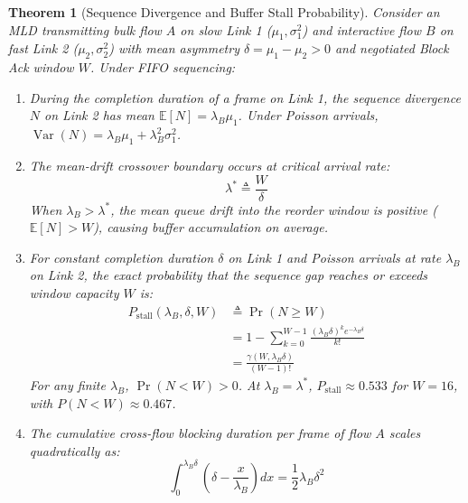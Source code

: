 \documentclass[10pt,journal,compsoc]{IEEEtran}
\newtheorem{theorem}{Theorem}
\begin{document}
\begin{theorem}[Sequence Divergence and Buffer Stall Probability]
\label{thm:collapse}
Consider an MLD transmitting bulk flow $A$ on slow Link 1 ($\mu_1, \sigma_1^2$) and interactive flow $B$ on fast Link 2 ($\mu_2, \sigma_2^2$) with mean asymmetry $\delta = \mu_1 - \mu_2 > 0$ and negotiated Block Ack window $W$. Under FIFO sequencing:
\begin{enumerate}
    \item During the completion duration of a frame on Link 1, the sequence divergence $N$ on Link 2 has mean $\mathbb{E}[N] = \lambda_B \mu_1$. Under Poisson arrivals, $\operatorname{Var}(N) = \lambda_B \mu_1 + \lambda_B^2 \sigma_1^2$.
    \item The mean-drift crossover boundary occurs at critical arrival rate:
    \begin{equation}
        \lambda^* \triangleq \frac{W}{\delta}
    \end{equation}
    When $\lambda_B > \lambda^*$, the mean queue drift into the reorder window is positive ($\mathbb{E}[N] > W$), causing buffer accumulation on average.
    \item For constant completion duration $\delta$ on Link 1 and Poisson arrivals at rate $\lambda_B$ on Link 2, the exact probability that the sequence gap reaches or exceeds window capacity $W$ is:
    \begin{align}
        P_{\text{stall}}(\lambda_B, \delta, W) &\triangleq \Pr(N \ge W) \nonumber \\
        &= 1 - \sum_{k=0}^{W-1} \frac{(\lambda_B \delta)^k e^{-\lambda_B \delta}}{k!} \nonumber \\
        &= \frac{\gamma(W, \lambda_B \delta)}{(W-1)!}
    \end{align}
    For any finite $\lambda_B$, $\Pr(N < W) > 0$. At $\lambda_B = \lambda^*$, $P_{\text{stall}} \approx 0.533$ for $W=16$, with $P(N < W) \approx 0.467$.
    \item The cumulative cross-flow blocking duration per frame of flow $A$ scales quadratically as:
    \begin{equation}
        \int_0^{\lambda_B \delta} \left(\delta - \frac{x}{\lambda_B}\right) dx = \frac{1}{2} \lambda_B \delta^2
    \end{equation}
\end{enumerate}
\end{theorem}
\end{document}

